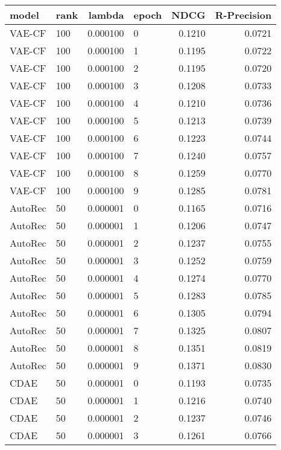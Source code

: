 \begin{tabular}{llrlrr}
\toprule
   model & rank &    lambda & epoch &    NDCG &  R-Precision \\
\midrule
  VAE-CF &  100 &  0.000100 &     0 &  0.1210 &       0.0721 \\
  VAE-CF &  100 &  0.000100 &     1 &  0.1195 &       0.0722 \\
  VAE-CF &  100 &  0.000100 &     2 &  0.1195 &       0.0720 \\
  VAE-CF &  100 &  0.000100 &     3 &  0.1208 &       0.0733 \\
  VAE-CF &  100 &  0.000100 &     4 &  0.1210 &       0.0736 \\
  VAE-CF &  100 &  0.000100 &     5 &  0.1213 &       0.0739 \\
  VAE-CF &  100 &  0.000100 &     6 &  0.1223 &       0.0744 \\
  VAE-CF &  100 &  0.000100 &     7 &  0.1240 &       0.0757 \\
  VAE-CF &  100 &  0.000100 &     8 &  0.1259 &       0.0770 \\
  VAE-CF &  100 &  0.000100 &     9 &  0.1285 &       0.0781 \\
 AutoRec &   50 &  0.000001 &     0 &  0.1165 &       0.0716 \\
 AutoRec &   50 &  0.000001 &     1 &  0.1206 &       0.0747 \\
 AutoRec &   50 &  0.000001 &     2 &  0.1237 &       0.0755 \\
 AutoRec &   50 &  0.000001 &     3 &  0.1252 &       0.0759 \\
 AutoRec &   50 &  0.000001 &     4 &  0.1274 &       0.0770 \\
 AutoRec &   50 &  0.000001 &     5 &  0.1283 &       0.0785 \\
 AutoRec &   50 &  0.000001 &     6 &  0.1305 &       0.0794 \\
 AutoRec &   50 &  0.000001 &     7 &  0.1325 &       0.0807 \\
 AutoRec &   50 &  0.000001 &     8 &  0.1351 &       0.0819 \\
 AutoRec &   50 &  0.000001 &     9 &  0.1371 &       0.0830 \\
    CDAE &   50 &  0.000001 &     0 &  0.1193 &       0.0735 \\
    CDAE &   50 &  0.000001 &     1 &  0.1216 &       0.0740 \\
    CDAE &   50 &  0.000001 &     2 &  0.1237 &       0.0746 \\
    CDAE &   50 &  0.000001 &     3 &  0.1261 &       0.0766 \\

\end{tabular}

